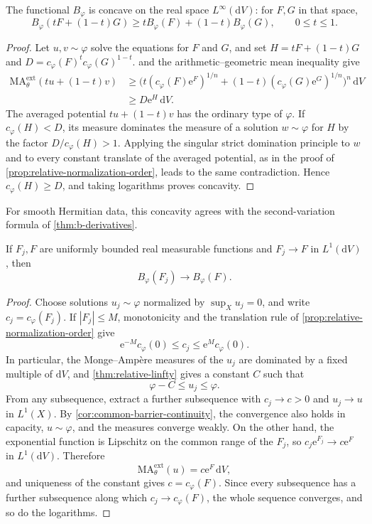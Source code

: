 \begin{theorem}\label{thm:relative-normalization-concavity}
The functional $B_\varphi$ is concave on the real space $L^\infty(\mathrm{d}V)$: for $F,G$ in that space,
\[
 B_\varphi(tF+(1-t)G)
 \geq tB_\varphi(F)+(1-t)B_\varphi(G),\qquad0\leq t\leq1.
\]
\end{theorem}
\begin{proof}
Let $u,v\sim\varphi$ solve the equations for $F$ and $G$, and set
$H=tF+(1-t)G$ and $D=c_\varphi(F)^t c_\varphi(G)^{1-t}$.  and the arithmetic--geometric mean inequality give
\[
 \begin{split}
 \mathrm{MA}^{\mathrm{ext}}_\theta(tu+(1-t)v)
 &\geq\bigl(t(c_\varphi(F)\mathrm{e}^F)^{1/n}
       +(1-t)(c_\varphi(G)\mathrm{e}^G)^{1/n}\bigr)^n\,\mathrm{d}V\\
 &\geq D \mathrm{e}^H\,\mathrm{d}V.
 \end{split}
\]
The averaged potential $tu+(1-t)v$ has the ordinary type of $\varphi$. If $c_\varphi(H)<D$, its measure dominates the measure of a solution $w\sim\varphi$ for $H$ by the factor $D/c_\varphi(H)>1$. Applying the singular strict domination principle to $w$ and to every constant translate of the averaged potential, as in the proof of \cref{prop:relative-normalization-order}, leads to the same contradiction. Hence $c_\varphi(H)\geq D$, and taking logarithms proves concavity.
\end{proof}

For smooth Hermitian data, this concavity agrees with the second-variation formula of \cref{thm:b-derivatives}.

\begin{theorem}\label{thm:normalization-bounded-lone}
If $F_j,F$ are uniformly bounded real measurable functions and $F_j\to F$ in $L^1(\mathrm{d}V)$, then
\[
 B_\varphi(F_j)\longrightarrow B_\varphi(F).
\]
\end{theorem}
\begin{proof}
Choose solutions $u_j\sim\varphi$ normalized by $\sup_Xu_j=0$, and write $c_j=c_\varphi(F_j)$. If $|F_j|\leq M$, monotonicity and the translation rule of \cref{prop:relative-normalization-order} give
\[
 \mathrm{e}^{-M}c_\varphi(0)\leq c_j\leq \mathrm{e}^M c_\varphi(0).
\]
In particular, the Monge--Amp\`ere measures of the $u_j$ are dominated by a fixed multiple of $\mathrm{d}V$, and \cref{thm:relative-linfty} gives a constant $C$ such that
\[
 \varphi-C\leq u_j\leq\varphi.
\]
From any subsequence, extract a further subsequence with $c_j\to c>0$ and $u_j\to u$ in $L^1(X)$. By \cref{cor:common-barrier-continuity}, the convergence also holds in capacity, $u\sim\varphi$, and the measures converge weakly. On the other hand, the exponential function is Lipschitz on the common range of the $F_j$, so $c_j\mathrm{e}^{F_j}\to c\mathrm{e}^F$ in $L^1(\mathrm{d}V)$. Therefore
\[
 \mathrm{MA}^{\mathrm{ext}}_\theta(u)=c\mathrm{e}^F\,\mathrm{d}V,
\]
and uniqueness of the constant gives $c=c_\varphi(F)$. Since every subsequence has a further subsequence along which $c_j\to c_\varphi(F)$, the whole sequence converges, and so do the logarithms.
\end{proof}

